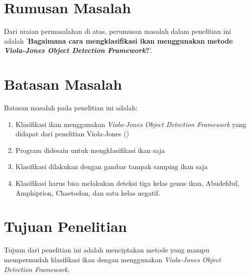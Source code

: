 \section{Rumusan Masalah}
Dari uraian permasalahan di atas, perumusan masalah dalam penelitian ini adalah 
'\textbf{Bagaimana cara mengklasifikasi ikan menggunakan metode 
\textit{Viola-Jones Object Detection Framework}?}'.

\section{Batasan Masalah}
Batasan masalah pada penelitian ini adalah:
\begin{enumerate}
	\item Klasifikasi ikan menggunakan \textit{Viola-Jones Object Detection Framework} yang didapat dari penelitian Viola-Jones (\cite{violaetal})
	\item Program didesain untuk mengklasifikasi ikan saja
	\item Klasifikasi dilakukan dengan gambar tampak samping ikan saja
	\item Klasifikasi harus bisa melakukan deteksi tiga kelas genus ikan, Abudefduf, Amphiprion, Chaetodon, 
	dan satu kelas negatif.
\end{enumerate}

\section{Tujuan Penelitian}
	Tujuan dari penelitian ini adalah menciptakan metode yang mampu mempermudah 
	klasifikasi ikan dengan menggunakan \textit{Viola-Jones Object Detection Framework}.

